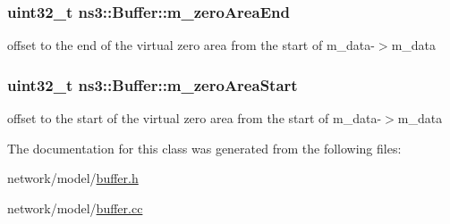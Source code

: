 \subsubsection[{\texorpdfstring{m\+\_\+zero\+Area\+End}{m_zeroAreaEnd}}]{\setlength{\rightskip}{0pt plus 5cm}uint32\+\_\+t ns3\+::\+Buffer\+::m\+\_\+zero\+Area\+End\hspace{0.3cm}{\ttfamily [private]}}\hypertarget{classns3_1_1Buffer_a50eb9a6ce5a2a75c25718edb92b8fdc0}{}\label{classns3_1_1Buffer_a50eb9a6ce5a2a75c25718edb92b8fdc0}
offset to the end of the virtual zero area from the start of m\+\_\+data-\/$>$m\+\_\+data 
\subsubsection[{\texorpdfstring{m\+\_\+zero\+Area\+Start}{m_zeroAreaStart}}]{\setlength{\rightskip}{0pt plus 5cm}uint32\+\_\+t ns3\+::\+Buffer\+::m\+\_\+zero\+Area\+Start\hspace{0.3cm}{\ttfamily [private]}}\hypertarget{classns3_1_1Buffer_ae2ebe054c3e7e2ecdfd7fcb318bf085c}{}\label{classns3_1_1Buffer_ae2ebe054c3e7e2ecdfd7fcb318bf085c}
offset to the start of the virtual zero area from the start of m\+\_\+data-\/$>$m\+\_\+data 

The documentation for this class was generated from the following files\+:\begin{DoxyCompactItemize}
\item 
network/model/\hyperlink{buffer_8h}{buffer.\+h}\item 
network/model/\hyperlink{buffer_8cc}{buffer.\+cc}\end{DoxyCompactItemize}
